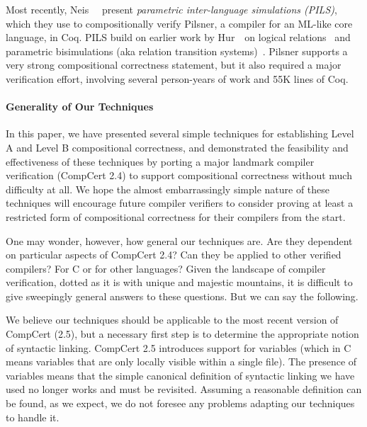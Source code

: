 Most recently, Neis~\etal~\cite{neis+:icfp15} present \emph{parametric
  inter-language simulations (PILS)}, which they use to
compositionally verify Pilsner, a compiler for an ML-like core
language, in Coq.  PILS build on earlier work by Hur~\etal\ on logical
relations~\cite{benton+:icfp09,hur+:popl11} and parametric
bisimulations (aka relation transition
systems)~\cite{hur+:popl12,rts-trans}.  Pilsner supports a very strong
compositional correctness statement, but it also required a major
verification effort, involving several person-years of work and 55K
lines of Coq.


\paragraph{Generality of Our Techniques}

In this paper, we have presented several simple techniques for
establishing Level A and Level B compositional correctness, and
demonstrated the feasibility and effectiveness of these techniques by
porting a major landmark compiler verification (CompCert 2.4) to
support compositional correctness without much difficulty at all.  We
hope the almost embarrassingly simple nature of these techniques will
encourage future compiler verifiers to consider proving at least a
restricted form of compositional correctness for their compilers from
the start.

One may wonder, however, how general our techniques are.  Are they
dependent on particular aspects of CompCert 2.4?  Can they be applied
to other verified compilers?  For C or for other languages?  Given the
landscape of compiler verification, dotted as it is with unique and
majestic mountains, it is difficult to give sweepingly general answers
to these questions.  But we can say the following.

We believe our techniques should be applicable to the most recent
version of CompCert (2.5), but a necessary first step is to determine
the appropriate notion of syntactic linking.  CompCert 2.5 introduces
support for  variables (which in C means variables that are
only locally visible within a single file).  The presence of
 variables means that the simple canonical definition of
syntactic linking we have used no longer works and must be revisited.
Assuming a reasonable definition can be found, as we expect, we do not
foresee any problems adapting our techniques to handle it.

